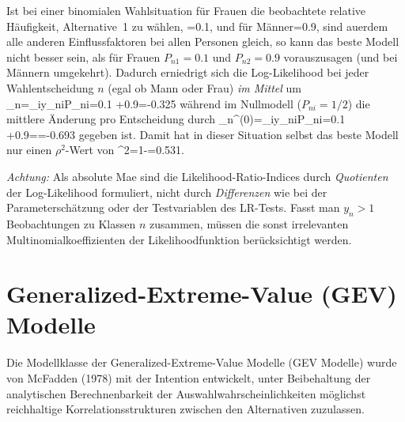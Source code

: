 {Ist bei einer
binomialen Wahlsituation f\"ur Frauen die beobachtete relative H\"aufigkeit, Alternative~1
zu w\"ahlen, =0.1, und f\"ur M\"anner=0.9, sind au\3erdem alle anderen
Einflussfaktoren bei allen Personen gleich, so kann das beste Modell
nicht besser sein, als f\"ur Frauen $P_{n1}=0.1$ und $P_{n2}=0.9$
vorauszusagen (und bei M\"annern umgekehrt). Dadurch
erniedrigt sich die Log-Likelihood bei jeder 
Wahlentscheidung $n$ (egal ob Mann oder Frau)  \emph{im Mittel} um 
\bdm
\Delta \tilL_n=\sum_iy_{ni}\ln P_{ni}=0.1 +0.9=-0.325
\edm
w\"ahrend im Nullmodell ($P_{ni}=1/2$) die mittlere \"Anderung pro Entscheidung
durch
\bdm
\Delta \tilL_n^{(0)}=\sum_iy_{ni}\ln P_{ni}=0.1 +0.9==-0.693
\edm
gegeben ist. Damit hat in dieser Situation
 selbst das beste Modell nur einen $\rho^2$-Wert
von 
\bdm
\rho^2=1-=0.531.
\edm
}

\emph{Achtung:} Als absolute Ma\3e sind die
Likelihood-Ratio-Indices durch
\emph{Quotienten} der Log-Likelihood formuliert, nicht durch \emph{Differenzen} wie
bei der Parametersch\"atzung oder der Testvariablen des LR-Tests. 
Fasst man $y_n>1$ Beobachtungen zu Klassen $n$ zusammen, m\"ussen die
sonst irrelevanten 
Multinomialkoeffizienten der Likelihoodfunktion
ber\"ucksichtigt werden.

\newpage
\section{\label{sec:GEV}Generalized-Extreme-Value (GEV) Modelle} 


Die Modellklasse der Generalized-Extreme-Value Modelle (GEV Modelle)
wurde von McFadden (1978) mit der Intention entwickelt, unter
Beibehaltung der analytischen Berechnenbarkeit der
Auswahlwahrscheinlichkeiten m\"oglichst reichhaltige
Korrelationsstrukturen zwischen den Alternativen zuzulassen.  



